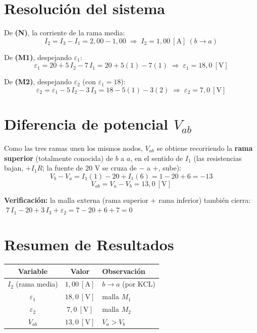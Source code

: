 \documentclass[12pt,letterpaper]{article}
\begin{document}
\section*{Resoluci\'on del sistema}

\noindent De \textbf{(N)}, la corriente de la rama media:
\[
    I_2 = I_3 - I_1 = 2{,}00 - 1{,}00
    \;\Rightarrow\; \boxed{I_2 = 1{,}00\ [\text{A}]\ (b\to a)}
\]

\noindent De \textbf{(M1)}, despejando $\varepsilon_1$:
\[
    \varepsilon_1 = 20 + 5\,I_2 - 7\,I_1 = 20 + 5(1) - 7(1)
    \;\Rightarrow\; \boxed{\varepsilon_1 = 18{,}0\ [\text{V}]}
\]

\noindent De \textbf{(M2)}, despejando $\varepsilon_2$ (con $\varepsilon_1=18$):
\[
    \varepsilon_2 = \varepsilon_1 - 5\,I_2 - 3\,I_3 = 18 - 5(1) - 3(2)
    \;\Rightarrow\; \boxed{\varepsilon_2 = 7{,}0\ [\text{V}]}
\]

\section*{Diferencia de potencial $V_{ab}$}

Como las tres ramas unen los mismos nodos, $V_{ab}$ se obtiene recorriendo la \textbf{rama superior}
(totalmente conocida) de $b$ a $a$, en el sentido de $I_1$ (las resistencias bajan, $+I_1R$; la
fuente de $20$ V se cruza de $-$ a $+$, sube):
\[
    V_b - V_a = I_1(1) - 20 + I_1(6) = 1 - 20 + 6 = -13
\]
\[
    \boxed{V_{ab} = V_a - V_b = 13{,}0\ [\text{V}]}
\]

\noindent\textbf{Verificaci\'on:} la malla externa (rama superior $+$ rama inferior) tambi\'en cierra:
$\;7\,I_1 - 20 + 3\,I_3 + \varepsilon_2 = 7 - 20 + 6 + 7 = 0$ \checkmark

\section*{Resumen de Resultados}

\begin{center}
\renewcommand{\arraystretch}{1.2}
\begin{tabular}{|c|c|l|}
\hline
\textbf{Variable} & \textbf{Valor} & \textbf{Observaci\'on} \\
\hline
$I_2$ (rama media)    & $1{,}00\ [\text{A}]$ & $b\to a$ (por KCL) \\
\hline
$\varepsilon_1$       & $18{,}0\ [\text{V}]$ & malla $M_1$ \\
$\varepsilon_2$       & $7{,}0\ [\text{V}]$  & malla $M_2$ \\
$V_{ab}$              & $13{,}0\ [\text{V}]$ & $V_a>V_b$ \\
\hline
\end{tabular}
\end{center}
\end{document}
